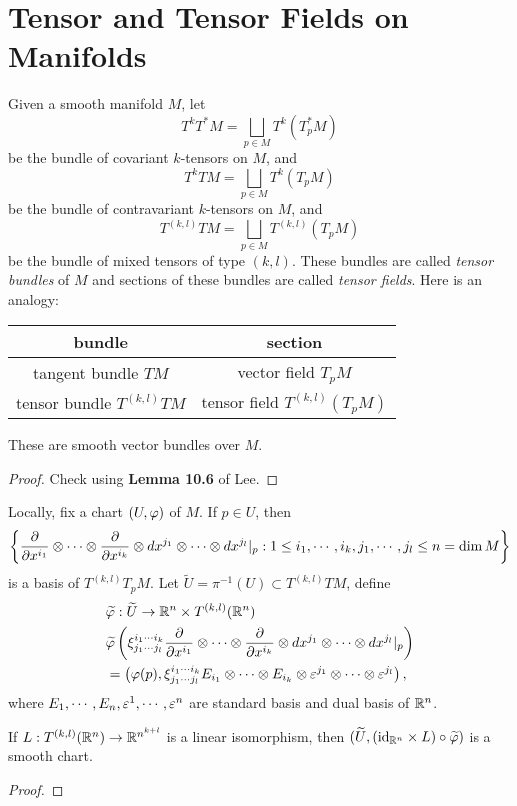 \section{Tensor and Tensor Fields on Manifolds}
Given a smooth manifold $M$, let
$$T^kT^*M = \bigsqcup_{p \in M} T^k(T_p^*M)$$ be the bundle of covariant $k$-tensors on $M$, and 
$$T^kTM = \bigsqcup_{p \in M} T^k(T_pM)$$ be the bundle of contravariant $k$-tensors on $M$, and
$$T^{(k,l)} TM = \bigsqcup_{p \in M} T^{(k,l)}(T_pM)$$ be the bundle of mixed tensors of type $(k,l)$. 
These bundles are called \textit{tensor bundles} of $M$ and sections of these bundles are called \textit{tensor fields}. Here is an analogy:
\begin{center}
    \begin{tabular}{c|c}
    bundle & section \\
    \hline 
    tangent bundle $TM$ & vector field $T_pM$ \\
    tensor bundle $T^{(k,l)}TM$ & tensor field $T^{(k,l)}(T_pM)$
    \end{tabular}
\end{center}
\begin{exercise}
    These are smooth vector bundles over $M$.
\end{exercise}
\begin{proof}
    Check using \textbf{Lemma 10.6} of Lee. 
\end{proof}
Locally, fix a chart $(U,\varphi)$ of $M$. If $p \in U$, then 
$$\left\{\pdv{}{x^{i_1}} \otimes \cdots \otimes \pdv{}{x^{i_k}} \otimes dx^{j_1} \otimes \cdots \otimes dx^{j_l}|_p: 1 \leq i_1, \cdots, i_k, j_1, \cdots, j_l \leq n = \dim M \right\}$$ is a basis of $T^{(k,l)}T_pM$. Let $\widetilde{U} = \pi^{-1}(U) \subset T^{(k,l)}TM$, define 
\begin{align*}
    &\widetilde{\varphi}:\widetilde{U} \to \mathbb{R}^n \times T^{(k,l)}(\mathbb{R}^n) \\
    &\widetilde{\varphi}\left(
    \xi_{j_1\cdots j_l}^{i_1\cdots i_k} 
    \pdv{}{x^{i_1}} \otimes \cdots \otimes \pdv{}{x^{i_k}} \otimes dx^{j_1} \otimes \cdots \otimes dx^{j_l}|_p
    \right) \\ &= \left(
    \varphi(p), \xi_{j_1\cdots j_l}^{i_1\cdots i_k} E_{i_1} \otimes \cdots \otimes E_{i_k} \otimes \varepsilon^{j_1} \otimes \cdots \otimes \varepsilon^{j_l}
    \right),
\end{align*}
where $E_1, \cdots, E_n, \varepsilon^1, \cdots, \varepsilon^n$ are standard basis and dual basis of $\mathbb{R}^n$.
\begin{proposition}
    If $L:T^{(k,l)}(\mathbb{R}^n) \to \mathbb{R}^{n^{k+l}}$ is a linear isomorphism, then $(\widetilde{U}, (\mathrm{id}_{\mathbb{R}^n} \times L) \circ \widetilde{\varphi})$ is a smooth chart.
\end{proposition}
\begin{proof}
    
\end{proof}

